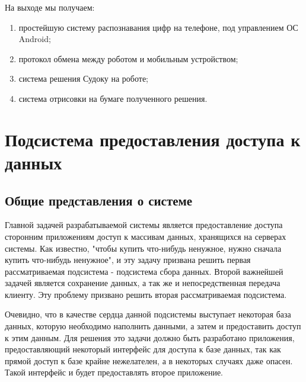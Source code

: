 На выходе мы получаем:
\begin{enumerate}
\item простейшую систему распознавания цифр на телефоне, под управлением ОС Android;
\item протокол обмена между роботом и мобильным устройством;
\item система решения Судоку на роботе;
\item система отрисовки на бумаге полученного решения.
\end{enumerate}


\section{Подсистема предоставления доступа к данных}

\subsection{Общие представления о системе}

Главной задачей разрабатываемой системы является предоставление доступа сторонним приложениям доступ к массивам данных, хранящихся на серверах системы. Как известно, "чтобы купить что-нибудь ненужное, нужно сначала купить что-нибудь ненужное", и эту задачу призвана решить первая рассматриваемая подсистема - подсистема сбора данных. Второй важнейшей задачей является сохранение данных, а так же и непосредственная передача клиенту. Эту проблему призвано решить вторая рассматриваемая подсистема.

Очевидно, что в качестве сердца данной подсистемы выступает некоторая база данных, которую необходимо наполнить данными, а затем и предоставить доступ к этим данным. Для решения это задачи должно быть разработано приложения, предоставляющий некоторый интерфейс для доступа к базе данных, так как прямой доступ к базе крайне нежелателен, а в некоторых случаях даже опасен. Такой интерфейс и будет предоставлять второе приложение.

